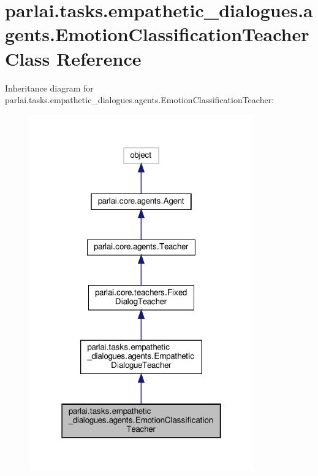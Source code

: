 \hypertarget{classparlai_1_1tasks_1_1empathetic__dialogues_1_1agents_1_1EmotionClassificationTeacher}{}\section{parlai.\+tasks.\+empathetic\+\_\+dialogues.\+agents.\+Emotion\+Classification\+Teacher Class Reference}
\label{classparlai_1_1tasks_1_1empathetic__dialogues_1_1agents_1_1EmotionClassificationTeacher}


Inheritance diagram for parlai.\+tasks.\+empathetic\+\_\+dialogues.\+agents.\+Emotion\+Classification\+Teacher\+:
\nopagebreak
\begin{figure}[H]
\begin{center}
\leavevmode
\includegraphics[width=274pt]{classparlai_1_1tasks_1_1empathetic__dialogues_1_1agents_1_1EmotionClassificationTeacher__inherit__graph}
\end{center}
\end{figure}


